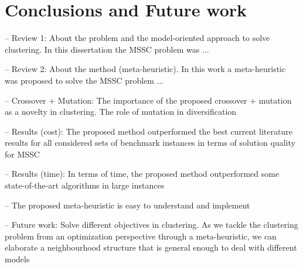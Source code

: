 \chapter{Conclusions and Future work}

-- Review 1: About the problem and the model-oriented approach to solve clustering.
In this dissertation the MSSC problem was ...

-- Review 2: About the method (meta-heuristic).
In this work a meta-heuristic was proposed to solve the MSSC problem ...

-- Crossover + Mutation: The importance of the proposed crossover + mutation as a novelty in clustering. The role of mutation in diversification

-- Results (cost): The proposed method outperformed the best current literature results for all considered sets of benchmark instances in terms of solution quality for MSSC

-- Results (time): In terms of time, the proposed method outperformed some state-of-the-art algorithms in large instances

-- The proposed meta-heuristic is easy to understand and implement

-- Future work: Solve different objectives in clustering. As we tackle the clustering problem from an optimization perspective through a meta-heuristic, we can elaborate a neighbourhood structure that is general enough to deal with different models